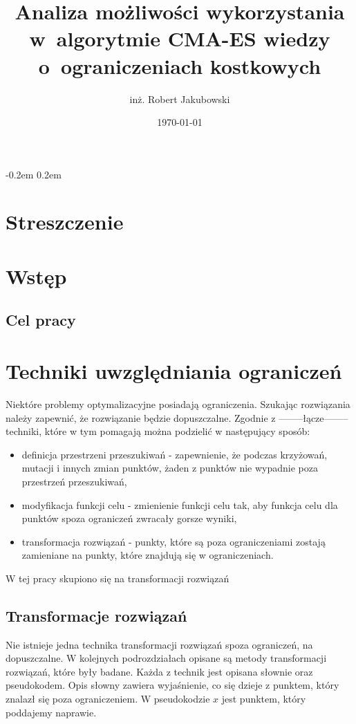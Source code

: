 \documentclass{mini}
\title{Analiza możliwości wykorzystania w~algorytmie CMA-ES wiedzy o~ograniczeniach kostkowych}
\author{inż. Robert Jakubowski}
\date{\today}
\begin{document}
\maketitle

\pagebreak
\thispagestyle{empty}

\openup -0.2em %
\tableofcontents 
\openup 0.2em %

\thispagestyle{empty}
\raggedbottom
\pagebreak


\section{Streszczenie}

\pagebreak

\section{Wstęp}

\subsection{Cel pracy}

\pagebreak

\section{Techniki uwzględniania ograniczeń} \label{odwolania}
Niektóre problemy optymalizacyjne posiadają ograniczenia. Szukając rozwiązania należy zapewnić, że rozwiązanie będzie dopuszczalne. Zgodnie z --------łącze-------- techniki, które w tym pomagają można podzielić w następujący sposób:
\begin{itemize}[noitemsep]
\item definicja przestrzeni przeszukiwań - zapewnienie, że podczas krzyżowań, mutacji i innych zmian punktów, żaden z punktów nie wypadnie poza przestrzeń przeszukiwań,
\item modyfikacja funkcji celu - zmienienie funkcji celu tak, aby funkcja celu dla punktów spoza ograniczeń zwracały gorsze wyniki,
\item transformacja rozwiązań - punkty, które są poza ograniczeniami zostają zamieniane na punkty, które znajdują się w ograniczeniach.
\end{itemize}

W tej pracy skupiono się na transformacji rozwiązań

\subsection{Transformacje rozwiązań}
Nie istnieje jedna technika transformacji rozwiązań spoza ograniczeń, na dopuszczalne. W kolejnych podrozdziałach opisane są metody transformacji rozwiązań, które były badane. Każda z technik jest opisana słownie oraz pseudokodem. Opis słowny zawiera wyjaśnienie, co się dzieje z punktem, który znalazł się poza ograniczeniem. W pseudokodzie $x$ jest punktem, który poddajemy naprawie.
\end{document}
